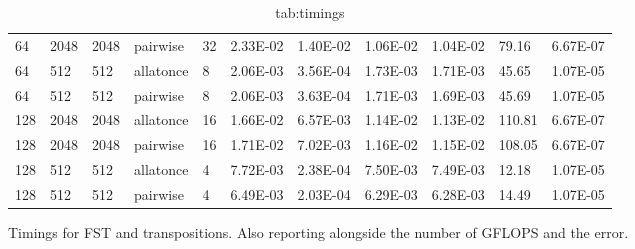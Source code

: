 \documentclass[11pt]{article}
\begin{document}
\begin{table}
\begin{adjustbox}{max width=\textwidth, max totalheight=0.95\textheight}
\begin{tabular}{lllllllllll}
      64  & 2048 & 2048 & pairwise  & 32   & 2.33E-02 & 1.40E-02 & 1.06E-02     & 1.04E-02 & 79.16  & 6.67E-07 \\
      64  & 512  & 512  & allatonce & 8    & 2.06E-03 & 3.56E-04 & 1.73E-03     & 1.71E-03 & 45.65  & 1.07E-05 \\
      64  & 512  & 512  & pairwise  & 8    & 2.06E-03 & 3.63E-04 & 1.71E-03     & 1.69E-03 & 45.69  & 1.07E-05 \\
      128 & 2048 & 2048 & allatonce & 16   & 1.66E-02 & 6.57E-03 & 1.14E-02     & 1.13E-02 & 110.81 & 6.67E-07 \\
      128 & 2048 & 2048 & pairwise  & 16   & 1.71E-02 & 7.02E-03 & 1.16E-02     & 1.15E-02 & 108.05 & 6.67E-07 \\
      128 & 512  & 512  & allatonce & 4    & 7.72E-03 & 2.38E-04 & 7.50E-03     & 7.49E-03 & 12.18  & 1.07E-05 \\
      128 & 512  & 512  & pairwise  & 4    & 6.49E-03 & 2.03E-04 & 6.29E-03     & 6.28E-03 & 14.49  & 1.07E-05 \\
      \bottomrule
    \end{tabular}
  \end{adjustbox}
  \caption{Timings for FST and transpositions. Also reporting alongside the number of GFLOPS and the error.}
  \caption{tab:timings}
\end{table}
\end{document}
